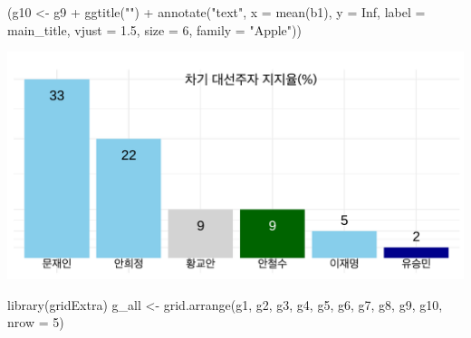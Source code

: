 \documentclass[
]{article}
\newenvironment{Shaded}{}{}
\newcommand{\AttributeTok}[1]{\textcolor[rgb]{0.49,0.56,0.16}{#1}}
\newcommand{\ConstantTok}[1]{\textcolor[rgb]{0.53,0.00,0.00}{#1}}
\newcommand{\DecValTok}[1]{\textcolor[rgb]{0.25,0.63,0.44}{#1}}
\newcommand{\FloatTok}[1]{\textcolor[rgb]{0.25,0.63,0.44}{#1}}
\newcommand{\FunctionTok}[1]{\textcolor[rgb]{0.02,0.16,0.49}{#1}}
\newcommand{\NormalTok}[1]{#1}
\newcommand{\OtherTok}[1]{\textcolor[rgb]{0.00,0.44,0.13}{#1}}
\newcommand{\SpecialCharTok}[1]{\textcolor[rgb]{0.25,0.44,0.63}{#1}}
\newcommand{\StringTok}[1]{\textcolor[rgb]{0.25,0.44,0.63}{#1}}
\begin{document}
\begin{Shaded}
\begin{Highlighting}[]
\NormalTok{(g10 }\OtherTok{\textless{}{-}}\NormalTok{ g9 }\SpecialCharTok{+}
    \FunctionTok{ggtitle}\NormalTok{(}\StringTok{""}\NormalTok{) }\SpecialCharTok{+}
    \FunctionTok{annotate}\NormalTok{(}\StringTok{"text"}\NormalTok{, }
             \AttributeTok{x =} \FunctionTok{mean}\NormalTok{(b1), }
             \AttributeTok{y =} \ConstantTok{Inf}\NormalTok{, }
             \AttributeTok{label =}\NormalTok{ main\_title, }
             \AttributeTok{vjust =} \FloatTok{1.5}\NormalTok{, }
             \AttributeTok{size =} \DecValTok{6}\NormalTok{,}
             \AttributeTok{family =} \StringTok{"Apple"}\NormalTok{))}
\end{Highlighting}
\end{Shaded}

\includegraphics{poll_JTBC_1702_pdf_files/figure-latex/unnamed-chunk-8-1.pdf}

\begin{Shaded}
\begin{Highlighting}[]
\FunctionTok{library}\NormalTok{(gridExtra)}
\NormalTok{g\_all }\OtherTok{\textless{}{-}} \FunctionTok{grid.arrange}\NormalTok{(g1, g2, g3, g4, g5, g6, g7, g8, g9, g10, }\AttributeTok{nrow =} \DecValTok{5}\NormalTok{)}
\end{Highlighting}
\end{Shaded}
\end{document}
